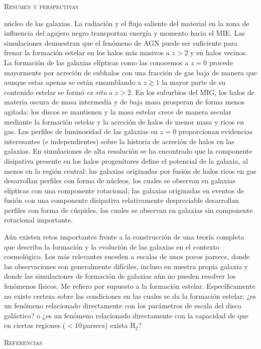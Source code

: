 \documentclass[xcolor=dvipsnames,4pt,hyperref={colorlinks,citecolor=black,linkcolor=black,urlcolor=black}]{beamer}
\begin{document}
\begin{frame}[allowframebreaks]{\textsc{Resumen y perspectivas}}
\begin{description}
núcleo de las galaxias. La radiación y el flujo saliente del material en la zona de influencia del
agujero negro transportan energía y momento hacia el MIE. Las simulaciones demuestran que el
fenómeno de AGN puede ser suficiente para frenar la formación estelar en los halos más masivos a
$z>2$ y en halos vecinos. La formación de las galaxias elípticas como las conocemos a $z=0$ procede
mayormente por acreción de subhalos con una fracción de gas baja de manera que aunque estas apenas
se están ensamblando a $z\gtrsim1$ la mayor parte de su contenido estelar se formó \emph{ex situ} a
$z>2$. En los suburbios del MIG, los halos de materia oscura de masa intermedia y de baja masa
prosperan de forma menos agitada: los discos se mantienen y la masa estelar crece de manera secular
mediante la formación estelar y la acreción de halos de menor masa y ricos en gas. Los perfiles de
luminosidad de las galaxias en $z=0$ proporcionan evidencias interesantes (e independientes) sobre
la historia de acreción de halos en las galaxias. En simulaciones de alta resolución se ha
encontrado que la componente disipativa presente en los halos progenitores define el potencial de la
galaxia, al menos en la región central: las galaxias originadas por fusión de halos ricos en gas
desarrollan perfiles con forma de núcleos, los cuales se observan en galaxias elípticas con una
componente rotacional; las galaxias originadas en eventos de fusión con una componente disipativa
relativamente despreciable desarrollan perfiles con forma de cúspides, los cuales se observan en
galaxias sin componente rotacional importante.

Aún existen retos importantes frente a la construcción de una teoría completa que describa la
formación y la evolución de las galaxias en el contexto cosmológico. Los más relevantes suceden a
escalas de unos pocos parsecs, donde las observaciones son generalmente difíciles, incluso en
nuestra propia galaxia y donde las simulaciones de formación de galaxias aún no pueden resolver los
fenómenos físicos. Me refiero por supuesto a la formación estelar. Específicamente no existe certeza
sobre las condiciones en las cuales se da la formación estelar: ¿es un fenómeno relacionado
directamente con los parámetros de escala del disco galáctico? o ¿es un fenómeno relacionado
directamente con la capacidad de que en ciertas regiones ($<10\,$parsecs) exista H$_2$?
%
\end{description}
%
\end{frame}

\begin{frame}[allowframebreaks]{\textsc{Referencias}}
\printbibliography
\end{frame}
\end{document}
